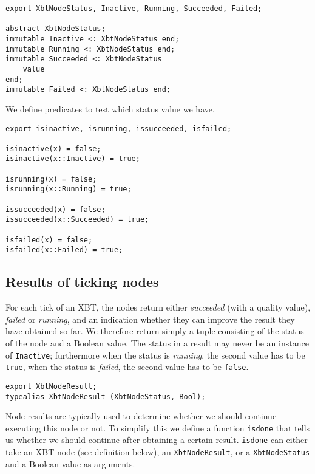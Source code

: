 \documentclass[a4wide]{article}
\begin{document}
\begin{verbatim}
export XbtNodeStatus, Inactive, Running, Succeeded, Failed;

abstract XbtNodeStatus;
immutable Inactive <: XbtNodeStatus end;
immutable Running <: XbtNodeStatus end;
immutable Succeeded <: XbtNodeStatus
    value
end;
immutable Failed <: XbtNodeStatus end;
\end{verbatim}

We define predicates to test which status value we have.

\begin{verbatim}
export isinactive, isrunning, issucceeded, isfailed;

isinactive(x) = false;
isinactive(x::Inactive) = true;

isrunning(x) = false;
isrunning(x::Running) = true;

issucceeded(x) = false;
issucceeded(x::Succeeded) = true;

isfailed(x) = false;
isfailed(x::Failed) = true;
\end{verbatim}

\subsection{Results of ticking nodes}
\label{sec-3-2}

For each tick of an XBT, the nodes return either \emph{succeeded} (with
a quality value), \emph{failed} or \emph{running}, and an indication whether
they can improve the result they have obtained so far.  We
therefore return simply a tuple consisting of the status of the
node and a Boolean value.  The status in a result may never be an
instance of \verb~Inactive~; furthermore when the status is \emph{running}, the
second value has to be \verb~true~, when the status is \emph{failed}, the
second value has to be \verb~false~.

\begin{verbatim}
export XbtNodeResult;
typealias XbtNodeResult (XbtNodeStatus, Bool);
\end{verbatim}

Node results are typically used to determine whether we should
continue executing this node or not.  To simplify this we define a
function \verb~isdone~ that tells us whether we should continue after
obtaining a certain result.  \verb~isdone~ can either take an XBT node
(see definition below), an \verb~XbtNodeResult~, or a \verb~XbtNodeStatus~
and a Boolean value as arguments.
\end{document}

